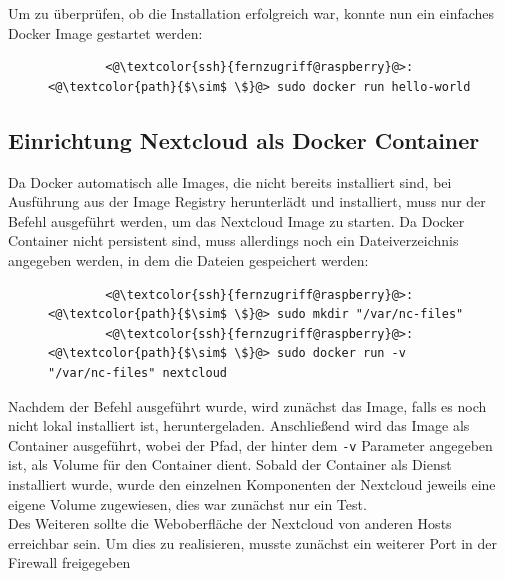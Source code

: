 \documentclass[a4paper, 11pt]{scrartcl}
\begin{document}
Um zu überprüfen, ob die Installation erfolgreich war, konnte nun ein einfaches Docker Image gestartet werden:
\begin{figure}[H]
    \begin{mdframed}[backgroundcolor=bbg]
        \begin{lstlisting}
        <@\textcolor{ssh}{fernzugriff@raspberry}@>:<@\textcolor{path}{$\sim$ \$}@> sudo docker run hello-world
        \end{lstlisting}
    \end{mdframed}
    \label{lst:setup_docker_repo}
\end{figure}


\subsection{Einrichtung Nextcloud als Docker Container}
Da Docker automatisch alle Images, die nicht bereits installiert sind, bei Ausführung aus der Image Registry herunterlädt und installiert, muss nur der Befehl ausgeführt werden,
um das Nextcloud Image zu starten. Da Docker Container nicht persistent sind, muss allerdings noch ein Dateiverzeichnis angegeben werden, in dem die Dateien gespeichert werden:
\begin{figure}[H]
    \begin{mdframed}[backgroundcolor=bbg]
        \begin{lstlisting}
        <@\textcolor{ssh}{fernzugriff@raspberry}@>:<@\textcolor{path}{$\sim$ \$}@> sudo mkdir "/var/nc-files"
        <@\textcolor{ssh}{fernzugriff@raspberry}@>:<@\textcolor{path}{$\sim$ \$}@> sudo docker run -v "/var/nc-files" nextcloud
        \end{lstlisting}
    \end{mdframed}
    \label{lst:folder_for_nextcloud}
\end{figure}
Nachdem der Befehl ausgeführt wurde, wird zunächst das Image, falls es noch nicht lokal installiert ist, heruntergeladen. Anschließend wird das Image als Container ausgeführt, wobei
der Pfad, der hinter dem \lstinline[basicstyle={\small\ttfamily\color{black}}]|-v| Parameter angegeben ist, als Volume für den Container dient. Sobald der Container als Dienst
installiert wurde, wurde den einzelnen Komponenten der Nextcloud jeweils eine eigene Volume zugewiesen, dies war zunächst nur ein Test.
\\
Des Weiteren sollte die Weboberfläche der Nextcloud von anderen Hosts erreichbar sein. Um dies zu realisieren, musste zunächst ein weiterer Port in der Firewall freigegeben
\end{document}
